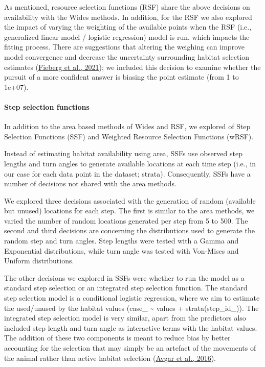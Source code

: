 \documentclass[10pt,a4paper]{article}
\begin{document}
As mentioned, resource selection functions (RSF) share the above decisions on availability with the Wides methods.
In addition, for the RSF we also explored the impact of varying the weighting of the available points when the RSF (i.e., generalized linear model / logistic regression) model is run, which impacts the fitting process.
There are suggestions that altering the weighing can improve model convergence and decrease the uncertainty surrounding habitat selection estimates (\protect\hyperlink{ref-fieberg_how_2021}{Fieberg et al., 2021}); we included this decision to examine whether the pursuit of a more confident answer is biasing the point estimate (from 1 to 1e+07).

\hypertarget{step-selection-functions}{%
\paragraph{Step selection functions}\label{step-selection-functions}}

In addition to the area based methods of Wides and RSF, we explored of Step Selection Functions (SSF) and Weighted Resource Selection Functions (wRSF).

Instead of estimating habitat availability using area, SSFs use observed step lengths and turn angles to generate available locations at each time step (i.e., in our case for each data point in the dataset; strata).
Consequently, SSFs have a number of decisions not shared with the area methods.

We explored three decisions associated with the generation of random (available but unused) locations for each step.
The first is similar to the area methods, we varied the number of random locations generated per step from 5 to 500.
The second and third decisions are concerning the distributions used to generate the random step and turn angles.
Step lengths were tested with a Gamma and Exponential distributions, while turn angle was tested with Von-Mises and Uniform distributions.

The other decisions we explored in SSFs were whether to run the model as a standard step selection or an integrated step selection function.
The standard step selection model is a conditional logistic regression, where we aim to estimate the used/unused by the habitat values (case\_ \textasciitilde{} values + strata(step\_id\_)).
The integrated step selection model is very similar, apart from the predictors also included step length and turn angle as interactive terms with the habitat values.
The addition of these two components is meant to reduce bias by better accounting for the selection that may simply be an artefact of the movements of the animal rather than active habitat selection (\protect\hyperlink{ref-avgar_integrated_2016}{Avgar et al., 2016}).
\end{document}
